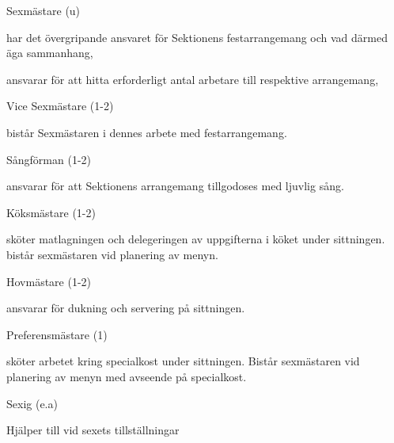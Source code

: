 \documentclass[10pt]{article}
\begin{document}
\begin{emptylist}
    \item Sexmästare (u)
        \begin{dashlist}
            \item har det övergripande ansvaret för Sektionens
                festarrangemang och vad därmed äga sammanhang,
            \item ansvarar för att hitta erforderligt antal arbetare
                till respektive arrangemang,
        \end{dashlist}
    \item Vice Sexmästare (1-2)
        \begin{dashlist}
            \item bistår Sexmästaren i dennes arbete med festarrangemang.
        \end{dashlist}
    \item Sångförman (1-2)
        \begin{dashlist}
            \item ansvarar för att Sektionens arrangemang tillgodoses
                med ljuvlig sång.
        \end{dashlist}
    \item Köksmästare (1-2)
        \begin{dashlist}
        \item sköter matlagningen och delegeringen av uppgifterna i köket under sittningen. bistår sexmästaren vid planering
        av menyn.
        \end{dashlist}
    \item Hovmästare (1-2)
        \begin{dashlist}
        \item ansvarar för dukning och servering på sittningen.
        \end{dashlist}
    \item Preferensmästare (1)
        \begin{dashlist}
        \item sköter arbetet kring specialkost under sittningen. Bistår sexmästaren vid planering av menyn med avseende på
        specialkost.
        \end{dashlist}
    \item Sexig (e.a)
        \begin{dashlist}
        \item Hjälper till vid sexets tillställningar
        \end{dashlist}

\end{emptylist}
\end{document}
